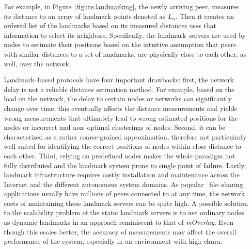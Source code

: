 

For example, in Figure~\ref{figure:landmarking}, the newly
arriving peer, measures its distance to an array of landmark points denoted as
$L_n$. Then it creates an ordered list of the landmarks based on its measured
distances uses that information to select its neighbors. Specifically,
the landmark--servers are used by nodes to estimate 
their positions based on the intuitive assumption that peers
with similar distances to a set of landmarks, are physically close to each
other, as well, over the network.  

Landmark--based protocols have four important drawbacks:
first, the network delay is not a reliable distance estimation method. For
example, based on the load on the network, the delay to certain nodes or
networks can significantly change over time; this eventually affects the
distance measurements and yields wrong measurements that ultimately lead to
wrong estimated positions for the nodes or incorrect and non--optimal
clusterings of nodes.
Second, it can be characterized as a rather coarse-grained approximation,
therefore not particularly well suited for identifying the correct positions
of nodes within close distance to each other.
Third, relying on predefined nodes makes the whole paradigm not fully
distributed and the landmark system prone to single point of failure.
Lastly, landmark infrastructure requires costly installation and maintenance 
across the Internet and the different autonomous system domains. As popular
\p\ file--sharing applications usually have millions of peers connected to at
any time, the network costs of maintaining these landmark servers can be quite
high. A possible solution to the scalability problem of the static landmark
servers is to use ordinary nodes as dynamic landmarks in an approach
reminiscent to that of \emph{mOverlay}. Even though this scales better, the
accuracy of measurements may affect the overall performance of the system,
especially in an environment with high churn.
